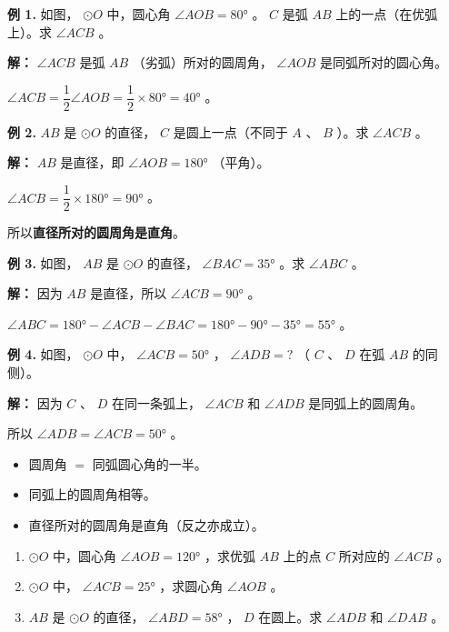 \begin{workedexamples}


\textbf{例 1.} 如图， $\odot O$ 中，圆心角 $\angle AOB = 80°$ 。 $C$ 是弧 $AB$ 上的一点（在优弧上）。求 $\angle ACB$ 。

\textbf{解：}
$\angle ACB$ 是弧 $AB$ （劣弧）所对的圆周角， $\angle AOB$ 是同弧所对的圆心角。

$\angle ACB = \dfrac{1}{2} \angle AOB = \dfrac{1}{2} \times 80° = 40°$ 。

\textbf{例 2.} $AB$ 是 $\odot O$ 的直径， $C$ 是圆上一点（不同于 $A$ 、 $B$ ）。求 $\angle ACB$ 。

\textbf{解：}
$AB$ 是直径，即 $\angle AOB = 180°$ （平角）。

$\angle ACB = \dfrac{1}{2} \times 180° = 90°$ 。

所以\textbf{直径所对的圆周角是直角}。

\textbf{例 3.} 如图， $AB$ 是 $\odot O$ 的直径， $\angle BAC = 35°$ 。求 $\angle ABC$ 。

\textbf{解：}
因为 $AB$ 是直径，所以 $\angle ACB = 90°$ 。

$\angle ABC = 180° - \angle ACB - \angle BAC = 180° - 90° - 35° = 55°$ 。

\textbf{例 4.} 如图， $\odot O$ 中， $\angle ACB = 50°$ ， $\angle ADB = ?$ （ $C$ 、 $D$ 在弧 $AB$ 的同侧）。

\textbf{解：}
因为 $C$ 、 $D$ 在同一条弧上， $\angle ACB$ 和 $\angle ADB$ 是同弧上的圆周角。

所以 $\angle ADB = \angle ACB = 50°$ 。

\end{workedexamples}

\begin{keytakeaway}


\begin{itemize}
  \item 圆周角 $=$ 同弧圆心角的一半。
  \item 同弧上的圆周角相等。
  \item 直径所对的圆周角是直角（反之亦成立）。
\end{itemize}


\end{keytakeaway}

\begin{practice}


\begin{enumerate}
  \item $\odot O$ 中，圆心角 $\angle AOB = 120°$ ，求优弧 $AB$ 上的点 $C$ 所对应的 $\angle ACB$ 。
  \item $\odot O$ 中， $\angle ACB = 25°$ ，求圆心角 $\angle AOB$ 。
  \item $AB$ 是 $\odot O$ 的直径， $\angle ABD = 58°$ ， $D$ 在圆上。求 $\angle ADB$ 和 $\angle DAB$ 。
\end{enumerate}


\end{practice}



